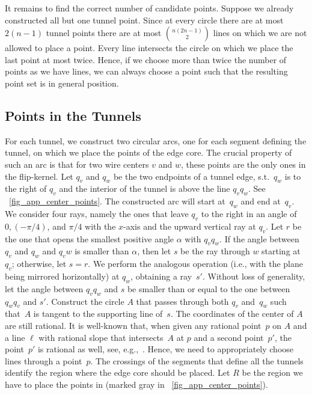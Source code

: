 \documentclass[11pt,a4paper]{article}
\begin{document}
It remains to find the correct number of candidate points.
Suppose we already constructed all but one tunnel point.
Since at every circle there are at most $2(n-1)$ tunnel points there are at most $\binom{n(2n-1)}{2}$ lines on which we are not allowed to place a point.
Every line intersects the circle on which we place the last point at most twice.
Hence, if we choose more than twice the number of points as we have lines, we can always choose a point such that the resulting point set is in general position.

\subsection{Points in the Tunnels}
For each tunnel, we construct two circular arcs, one for each segment defining the tunnel, on which we place the points of the edge core.
The crucial property of such an arc is that for two wire centers $v$ and $w$, these points are the only ones in the flip-kernel.
Let $q_v$ and $q_w$ be the two endpoints of a tunnel edge, s.t.\ $q_w$ is to the right of $q_v$ and the interior of the tunnel is above the line $q_v q_w$.
See \figurename~\ref{fig_app_center_points}.
The constructed arc will start at~$q_w$ and end at~$q_v$.
We consider four rays, namely the ones that leave $q_v$ to the right in an angle of $0, (-\pi/4)$, and $\pi/4$ with the $x$-axis and the upward vertical ray at $q_v$.
Let $r$ be the one that opens the smallest positive angle $\alpha$ with $q_v q_w$.
If the angle between $q_v$ and $q_w$ and $q_v w$ is smaller than $\alpha$, then let $s$ be the ray through $w$ starting at $q_v$; otherwise, let $s=r$.
We perform the analogous operation (i.e., with the plane being mirrored horizontally) at $q_w$, obtaining a ray~$s'$.
Without loss of generality, let the angle between $q_v q_w$ and $s$ be smaller than or equal to the one between $q_w q_v$ and $s'$.
Construct the circle $A$ that passes through both $q_v$ and~$q_w$ such that~$A$ is tangent to the supporting line of~$s$.
The coordinates of the center of $A$ are still rational.
It is well-known that, when given any rational point~$p$ on $A$ and a line $\ell$ with rational slope that intersects~$A$ at $p$ and a second point~$p'$, the point~$p'$ is rational as well, see, e.g.,~\cite[p.~5]{husemoeller}.
Hence, we need to appropriately choose lines through a point~$p$.
The crossings of the segments that define all the tunnels identify the region where the edge core should be placed.
Let $R$ be the region we have to place the points in (marked gray in \figurename~\ref{fig_app_center_points}).
\end{document}
